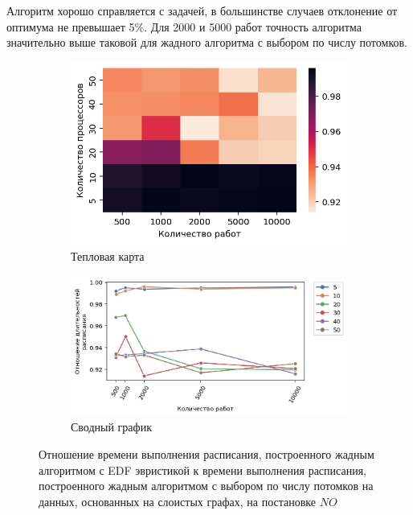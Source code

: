 Алгоритм хорошо справляется с задачей, в большинстве случаев отклонение от оптимума не превышает 5\%. Для 2000 и 5000 работ точность алгоритма значительно выше таковой для жадного алгоритма с выбором по числу потомков.

\begin{figure}[!htbp]
    \centering
    \begin{subfigure}{0.49\textwidth}
        \includegraphics[width=\textwidth]{imgs/layered_class_1/NO_EDF/times.png}
        \caption{Тепловая карта}
        \label{fig:NO-layered-EDF-times-heatmap}
    \end{subfigure}
    \hfill
    \begin{subfigure}{0.49\textwidth}
        \includegraphics[width=\textwidth]{imgs/layered_class_1/NO_EDF/gr_amalgamated.png}
        \caption{Сводный график} 
        \label{fig:NO-layered-EDF-times-compiled}
    \end{subfigure}
    \caption{Отношение времени выполнения расписания, построенного жадным алгоритмом с EDF эвристикой к времени выполнения расписания, построенного жадным алгоритмом с выбором по числу потомков на данных, основанных на слоистых графах, на постановке $NO$}
\end{figure}

